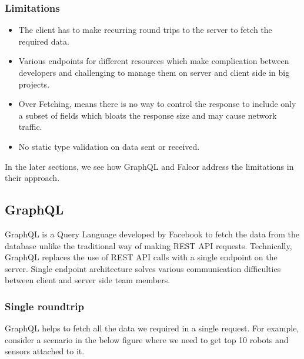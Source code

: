 	\subsubsection{Limitations}
	\begin{itemize}
		\item The client has to make recurring round trips to the server to fetch the required data.
		\item Various endpoints for different resources which make complication between developers and challenging to manage them on server and client side in big projects.
		\item Over Fetching, means there is no way to control the response to include only a subset of fields which bloats the response size and may cause network traffic.
		\item No static type validation on data sent or received.		
	\end{itemize}

	In the later sections, we see how GraphQL and Falcor address the limitations in their approach.
	
	\subsection{GraphQL}
	GraphQL is a Query Language developed by Facebook to fetch the data from the database unlike the traditional way of making REST API requests. Technically, GraphQL replaces the use of REST API calls with a single endpoint on the server. Single endpoint architecture solves various communication difficulties between client and server side team members. 
	
	\subsubsection{Single roundtrip}
	GraphQL helps to fetch all the data we required in a single request. For example, consider a scenario in the below figure where we need to get top 10 robots and sensors attached to it. 
	
